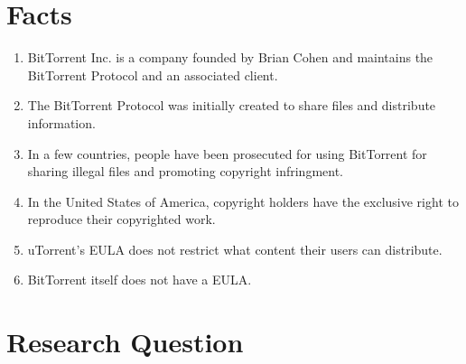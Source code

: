 \documentclass[11pt]{article}
\begin{document}
\newpage

\section{Facts}
\begin{enumerate}
\item BitTorrent Inc. is a company founded by Brian Cohen and maintains the BitTorrent Protocol and an associated client. \cite{btabout}
\item The BitTorrent Protocol was initially created to share files and distribute information. \cite{btabout}
\item In a few countries, people have been prosecuted for using BitTorrent for sharing illegal files and promoting copyright infringment. \cite{tpbverdict}
\item In the United States of America, copyright holders have the exclusive right to reproduce their copyrighted work. \cite{t17c1s106}
\item uTorrent's EULA does not restrict what content their users can distribute. \cite{utorrentEula}
\item BitTorrent itself does not have a EULA. \cite{utorrentEula}
\end{enumerate}

\section{Research Question}
\end{document}
